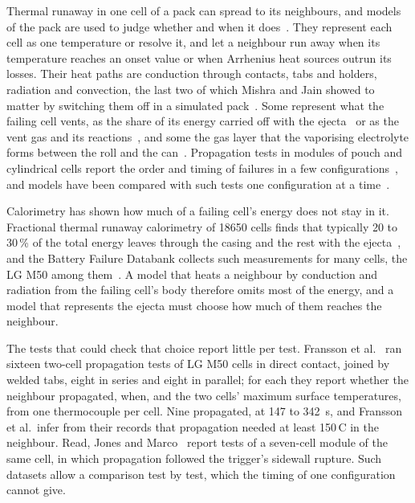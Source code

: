 \documentclass[preprint,12pt]{elsarticle}
\newcommand{\degC}{\,\textdegree C}
\begin{document}
Thermal runaway in one cell of a pack can spread to its neighbours, and models of the pack are used to judge whether and when it does~\cite{feng2015propagation,coman2017modelling,mishra2021multimode,hoelle2023simulation}. They represent each cell as one temperature or resolve it, and let a neighbour run away when its temperature reaches an onset value or when Arrhenius heat sources outrun its losses. Their heat paths are conduction through contacts, tabs and holders, radiation and convection, the last two of which Mishra and Jain showed to matter by switching them off in a simulated pack~\cite{mishra2021multimode}. Some represent what the failing cell vents, as the share of its energy carried off with the ejecta~\cite{coman2017modelling} or as the vent gas and its reactions~\cite{kim2021venting}, and some the gas layer that the vaporising electrolyte forms between the roll and the can~\cite{hoelle2023simulation}. Propagation tests in modules of pouch and cylindrical cells report the order and timing of failures in a few configurations~\cite{lamb2015failure,said2019cascading,torrescastro2020passive}, and models have been compared with such tests one configuration at a time~\cite{feng2015propagation,hoelle2023simulation}.

Calorimetry has shown how much of a failing cell's energy does not stay in it. Fractional thermal runaway calorimetry of 18650 cells finds that typically 20 to 30\,\% of the total energy leaves through the casing and the rest with the ejecta~\cite{walker2019decoupling}, and the Battery Failure Databank collects such measurements for many cells, the LG M50 among them~\cite{finegan2024databank}. A model that heats a neighbour by conduction and radiation from the failing cell's body therefore omits most of the energy, and a model that represents the ejecta must choose how much of them reaches the neighbour.

The tests that could check that choice report little per test. Fransson et al.~\cite{fransson2024exploring} ran sixteen two-cell propagation tests of LG M50 cells in direct contact, joined by welded tabs, eight in series and eight in parallel; for each they report whether the neighbour propagated, when, and the two cells' maximum surface temperatures, from one thermocouple per cell. Nine propagated, at 147 to 342~s, and Fransson et al.\ infer from their records that propagation needed at least 150\degC{} in the neighbour. Read, Jones and Marco~\cite{read2024sidewall} report tests of a seven-cell module of the same cell, in which propagation followed the trigger's sidewall rupture. Such datasets allow a comparison test by test, which the timing of one configuration cannot give.
\end{document}
